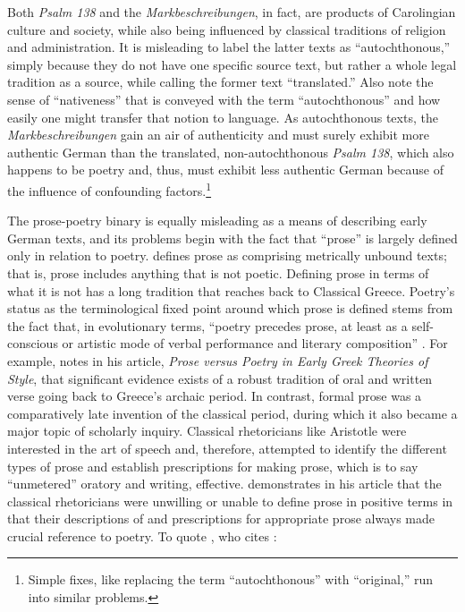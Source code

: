 Both \textit{Psalm 138} and the \textit{Markbeschreibungen}, in fact, are products of Carolingian culture and society, while also being influenced by classical traditions of religion and administration. It is misleading to label the latter texts as “autochthonous,” simply because they do not have one specific source text, but rather a whole legal tradition as a source, while calling the former text “translated.” Also note the sense of “nativeness” that is conveyed with the term “autochthonous” and how easily one might transfer that notion to language. As autochthonous texts, the \textit{Markbeschreibungen} gain an air of authenticity and must surely exhibit more authentic German than the translated, non-autochthonous \textit{Psalm 138}, which also happens to be poetry and, thus, must exhibit less authentic German because of the influence of confounding factors.\footnote{{Simple fixes, like replacing the term “autochthonous” with “original,” run into similar problems.} }

The prose-poetry binary is equally misleading as a means of describing early German texts, and its problems begin with the fact that “prose” is largely defined only in relation to poetry. \citet[28]{Fleischer2006} defines prose as comprising metrically unbound texts; that is, prose includes anything that is not poetic. Defining prose in terms of what it is not has a long tradition that reaches back to Classical Greece. Poetry’s status as the terminological fixed point around which prose is defined stems from the fact that, in evolutionary terms, “poetry precedes prose, at least as a self-conscious or artistic mode of verbal performance and literary composition” \citep[303]{Graff2005}. For example, \citet[303--304]{Graff2005} notes in his article, \textit{Prose versus Poetry in Early Greek Theories of Style}, that significant evidence exists of a robust tradition of oral and written verse going back to Greece’s archaic period. In contrast, formal prose was a comparatively late invention of the classical period, during which it also became a major topic of scholarly inquiry. Classical rhetoricians like Aristotle were interested in the art of speech and, therefore, attempted to identify the different types of prose and establish prescriptions for making prose, which is to say “unmetered” oratory and writing, effective. \citet{Graff2005} demonstrates in his article that the classical rhetoricians were unwilling or unable to define prose in positive terms in that their descriptions of and prescriptions for appropriate prose always made crucial reference to poetry. To quote \citet[305]{Graff2005}, who cites \citet{Nimis1994}:

